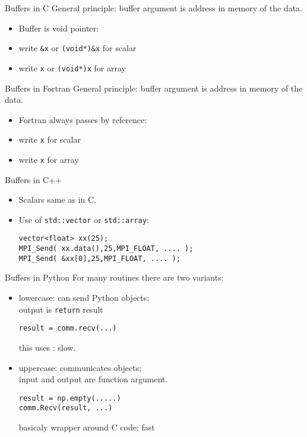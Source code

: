 \begin{numberedframe}{Buffers in C}
  General principle: buffer argument is address in memory of the data.
  \begin{itemize}
  \item Buffer is void pointer: 
  \item write \lstinline{&x} or \lstinline{(void*)&x} for scalar
  \item write \lstinline{x} or \lstinline{(void*)x} for array
  \end{itemize}
\end{numberedframe}

\begin{numberedframe}{Buffers in Fortran}
  General principle: buffer argument is address in memory of the data.
  \begin{itemize}
  \item Fortran always passes by reference:
  \item write \lstinline{x} for scalar
  \item write \lstinline{x} for array
  \end{itemize}
\end{numberedframe}

\begin{numberedframe}{Buffers in C++}
 \lstset{language=C++}
  \begin{itemize}
  \item Scalars same as in C.
  \item Use of \lstinline+std::vector+ or \lstinline+std::array+:
\begin{lstlisting}
vector<float> xx(25);
MPI_Send( xx.data(),25,MPI_FLOAT, .... );
MPI_Send( &xx[0],25,MPI_FLOAT, .... );
\end{lstlisting}
  \end{itemize}
 \lstset{language=C}
\end{numberedframe}

\begin{numberedframe}{Buffers in Python}
  For many routines there are two variants:
  \begin{itemize}
  \item lowercase: can send Python objects;\\
    output is \lstinline{return} result\\
\begin{verbatim}
result = comm.recv(...)
\end{verbatim}
    this uses : slow.
  \item uppercase: communicates  objects;\\
    input and output are function argument.
\begin{verbatim}
result = np.empty(.....)
comm.Recv(result, ...)
\end{verbatim}
    basicaly wrapper around C code: fast
  \end{itemize}
\end{numberedframe}

